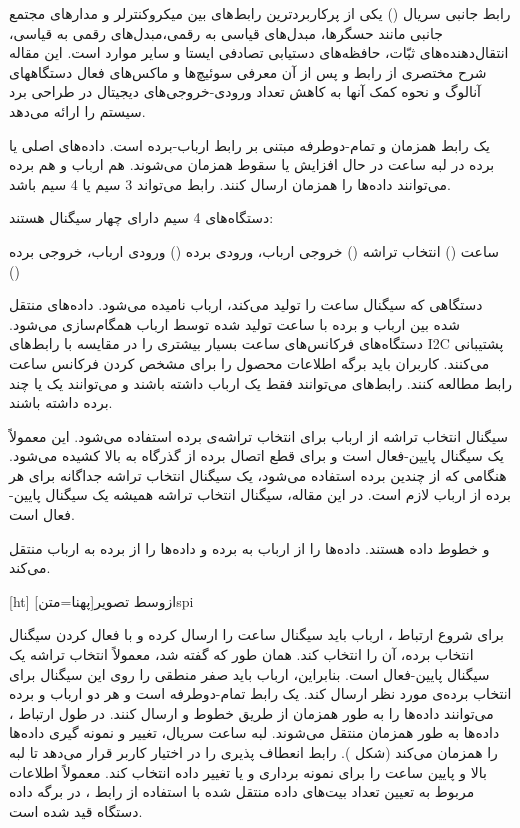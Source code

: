 
رابط جانبی سریال () یکی از پرکاربردترین رابط‌های بین میکروکنترلر و مدارهای مجتمع جانبی مانند حسگرها، مبدل‌های قیاسی به رقمی،مبدل‌های رقمی به قیاسی، انتقال‌دهنده‌های ثبّات، حافظه‌های دستیابی تصادفی ایستا و سایر موارد است. این مقاله شرح مختصری از رابط  و پس از آن معرفی سوئیچ‌ها و ماکس‌های فعال دستگاههای آنالوگ و نحوه کمک آنها به کاهش تعداد ورودی-خروجی‌های دیجیتال در طراحی برد سیستم را ارائه می‌دهد.

یک رابط همزمان و تمام-دوطرفه مبتنی بر رابط ارباب-برده است. داده‌های اصلی یا برده در لبه ساعت در حال افزایش یا سقوط همزمان می‌شوند. هم ارباب و هم برده می‌توانند داده‌ها را همزمان ارسال کنند. رابط  می‌تواند 3 سیم یا 4 سیم باشد.

دستگاه‌های 4 سیم  دارای چهار سیگنال هستند:

 ساعت ()
 انتخاب تراشه ()
 خروجی ارباب، ورودی برده ()
 ورودی ارباب، خروجی برده ()

دستگاهی که سیگنال ساعت را تولید می‌کند، ارباب نامیده می‌شود. داده‌های منتقل شده بین ارباب و برده با ساعت تولید شده توسط ارباب همگام‌سازی می‌شود. دستگاه‌های  فرکانس‌های ساعت بسیار بیشتری را در مقایسه با رابط‌های I2C پشتیبانی می‌کنند. کاربران باید برگه اطلاعات محصول را برای مشخص کردن فرکانس ساعت رابط  مطالعه کنند. رابط‌های  می‌توانند فقط یک ارباب داشته باشند و می‌توانند یک یا چند برده داشته باشند.

سیگنال انتخاب تراشه از ارباب برای انتخاب تراشه‌ی برده استفاده می‌شود. این معمولاً یک سیگنال پایین-فعال است و برای قطع اتصال برده از گذرگاه  به بالا کشیده می‌شود. هنگامی که از چندین برده استفاده می‌شود، یک سیگنال انتخاب تراشه جداگانه برای هر برده از ارباب لازم است. در این مقاله، سیگنال انتخاب تراشه همیشه یک سیگنال پایین-فعال است.

و  خطوط داده هستند.  داده‌ها را از ارباب به برده و  داده‌ها را از برده به ارباب منتقل می‌کند.

[ht]
‌ازوسط
‌تصویر[پهنا=‌متن]{spi}

برای شروع ارتباط ، ارباب باید سیگنال ساعت را ارسال کرده و با فعال کردن سیگنال انتخاب برده، آن را انتخاب کند. همان طور که گفته شد، معمولاً انتخاب تراشه یک سیگنال پایین-فعال است. بنابراین، ارباب باید صفر منطقی را روی این سیگنال برای انتخاب برده‌ی مورد نظر ارسال کند.  یک رابط تمام-دوطرفه است و هر دو ارباب و برده می‌توانند داده‌ها را به طور همزمان از طریق خطوط  و  ارسال کنند. در طول ارتباط ، داده‌ها به طور همزمان منتقل می‌شوند. لبه ساعت سریال، تغییر و نمونه گیری داده‌ها را همزمان می‌کند (شکل ). رابط  انعطاف پذیری را در اختیار کاربر قرار می‌دهد تا لبه بالا و پایین ساعت را برای نمونه برداری و یا تغییر داده انتخاب کند. معمولاً اطلاعات مربوط به تعیین تعداد بیت‌های داده منتقل شده با استفاده از رابط ، در برگه داده دستگاه قید شده است.

